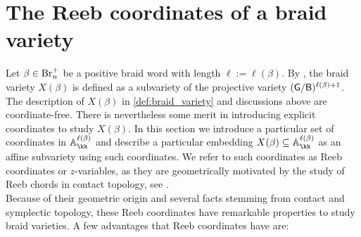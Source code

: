 \section{The Reeb coordinates of a braid variety}\label{sec:Reeb_variables} Let $\beta\in\mbox{Br}_n^+$ be a positive braid word with length $\ell:=\ell(\beta)$. By , the braid variety $X(\beta)$ is defined as a subvariety of the projective variety $(\mathsf{G}/\mathsf{B})^{\ell(\beta)+1}$. The description of $X(\beta)$ in \cref{def:braid_variety} and discussions above are coordinate-free. There is nevertheless some merit in introducing explicit coordinates to study $X(\beta)$. In this section we introduce a particular set of coordinates in $\mathbb{A}_\kk^{\ell(\beta)}$ and describe a particular embedding $X(\beta)\sse\mathbb{A}_\kk^{\ell(\beta)}$ as an affine subvariety using such coordinates. We refer to such coordinates as Reeb coordinates or $z$-variables, as they are geometrically motivated by the study of Reeb chords in contact topology, see \cite[Section 5.1]{CasalsNg22}.\\

Because of their geometric origin and several facts stemming from contact and symplectic topology, these Reeb coordinates have remarkable properties to study braid varieties. A few advantages that Reeb coordinates have are:

